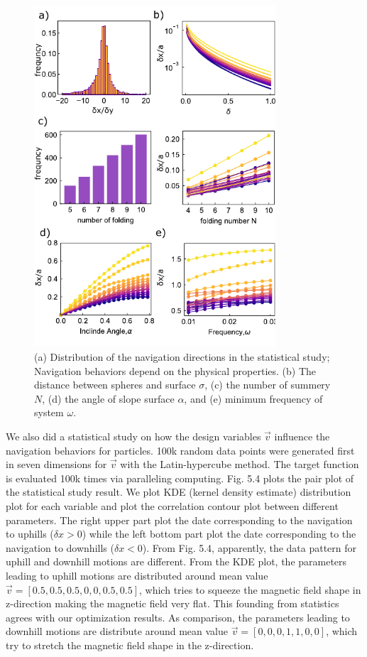\begin{figure}[p]
\centering
\includegraphics[width=9cm]{figures/5_5.pdf}
\caption{(a) Distribution of the navigation directions in the statistical study; Navigation behaviors depend on the physical properties. (b) The distance between spheres and surface $\sigma$, (c) the number of summery $N$, (d) the angle of slope surface $\alpha$, and (e) minimum frequency of system  $\omega$. }
\label{fig:5.5}
\end{figure}


We also did a statistical study on how the design variables $\vec{v}$ influence the  navigation behaviors for particles. 100k random data points were generated first in seven dimensions for $\vec{v}$ with the Latin-hypercube method\autocite{park1994optimal}. The target function is evaluated 100k times via paralleling computing. Fig. 5.4 plots the pair plot of the statistical study result. We plot KDE (kernel density estimate) distribution plot for each variable and plot the correlation contour plot between different parameters. The right upper part plot the date corresponding to the navigation to uphills ($\delta x>0$) while the left bottom part plot the date corresponding to the navigation to downhills ($\delta x<0$). From Fig. 5.4, apparently, the data pattern for uphill and downhill motions are different. From the KDE plot, the parameters leading to uphill motions are distributed around mean value $\vec{v}=[0.5,0.5,0.5,0,0,0.5,0.5]$, which tries to squeeze the magnetic field shape in z-direction making the magnetic field  very flat. This founding from statistics agrees with our optimization results. As comparison, the parameters leading to downhill motions are distribute around mean value $\vec{v}=[0,0,0,1,1,0,0]$, which try to 
stretch the magnetic field shape in the z-direction.
 
